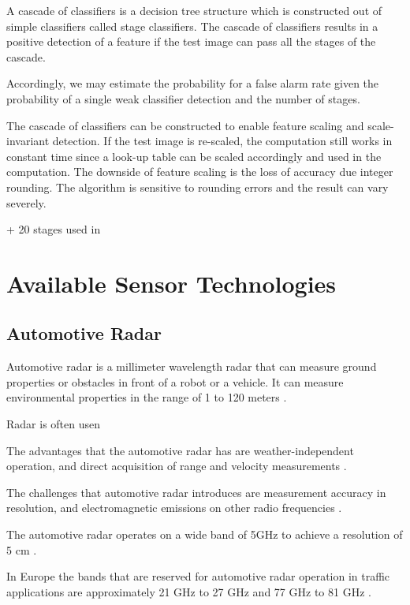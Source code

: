 \documentclass[12pt,a4paper,oneside,pdftex]{report}
\begin{document}
A cascade of classifiers is a decision tree structure which is constructed out of simple classifiers called stage classifiers. The cascade of classifiers results in a positive detection of a feature if the test image can pass all the stages of the cascade.


Accordingly, we may estimate the probability for a false alarm rate given the probability of a single weak classifier detection and the number of stages.


The cascade of classifiers can be constructed to enable feature scaling and scale-invariant detection. If the test image is re-scaled, the computation still works in constant time since a look-up table can be scaled accordingly and used in the computation. The downside of feature scaling is the loss of accuracy due integer rounding. The algorithm is sensitive to rounding errors and the result can vary severely.


+ 20 stages used in \cite{Lienhart03}


\chapter{Available Sensor Technologies}

\section{Automotive Radar}

Automotive radar is a millimeter wavelength radar that can measure ground properties or obstacles in front of a robot or a vehicle. It can measure environmental properties in the range of 1 to 120 meters \cite{Ahtiainen12}.

Radar is often usen

The advantages that the automotive radar has are weather-independent operation, and direct acquisition of range and velocity measurements \cite{Wenger07}.

The challenges that automotive radar introduces are measurement accuracy in resolution, and electromagnetic emissions on other radio frequencies \cite{Wenger07}. 

The automotive radar operates on a wide band of 5GHz to achieve a resolution of 5 cm \cite{Wenger07}.

In Europe the bands that are reserved for automotive radar operation in traffic applications are approximately 21 GHz to 27 GHz and 77 GHz to 81 GHz \cite{Wenger07}.
\end{document}
